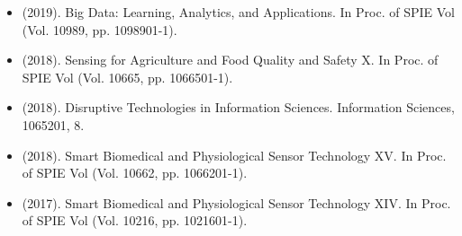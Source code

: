 \documentclass[]{template}
\begin{document}
\sectionsep 
{}
\sectionsep

\begin{itemize}

\item (2019). Big Data: Learning, Analytics, and Applications. In Proc. of SPIE Vol (Vol. 10989, pp. 1098901-1).

\item  (2018). Sensing for Agriculture and Food Quality and Safety X. In Proc. of SPIE Vol (Vol. 10665, pp. 1066501-1).

\item (2018). Disruptive Technologies in Information Sciences. Information Sciences, 1065201, 8.

\item (2018). Smart Biomedical and Physiological Sensor Technology XV. In Proc. of SPIE Vol (Vol. 10662, pp. 1066201-1).


\item (2017). Smart Biomedical and Physiological Sensor Technology XIV. In Proc. of SPIE Vol (Vol. 10216, pp. 1021601-1).

\end{itemize}

\end{document}

